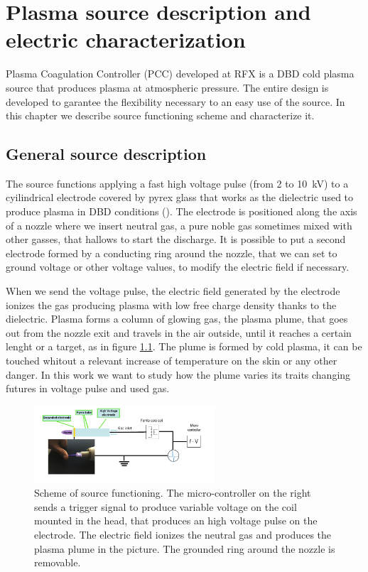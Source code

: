 \chapter{Plasma source description and electric characterization}
\label{ch:electric}
Plasma Coagulation Controller (PCC) developed at RFX is a DBD cold plasma source that produces plasma at atmospheric pressure. The entire design is developed to garantee the flexibility necessary to an easy use of the source. In this chapter we describe source functioning scheme and characterize it.

\section{General source description}
The source functions applying a fast high voltage pulse (from \num{2} to \SI{10}{\kilo\volt}) to a cyilindrical electrode covered by pyrex glass that works as the dielectric used to produce plasma in DBD conditions (\cite{DeMasi_2018}). The electrode is positioned along the axis of a nozzle where we insert neutral gas, a pure noble gas sometimes mixed with other gasses, that hallows to start the discharge. It is possible to put a second electrode formed by a conducting ring around the nozzle, that we can set to ground voltage or other voltage values, to modify the electric field if necessary.

When we send the voltage pulse, the electric field generated by the electrode ionizes the gas producing plasma with low free charge density thanks to the dielectric. Plasma forms a column of glowing gas, the plasma plume, that goes out from the nozzle exit and travels in the air outside, until it reaches a certain lenght or a target, as in figure \ref{fig:source_scheme}. The plume is formed by cold plasma, it can be touched whitout a relevant increase of temperature on the skin or any other danger. In this work we want to study how the plume varies its traits changing futures in voltage pulse and used gas.

\begin{figure}
 \centering
 \includegraphics[width=0.6\textwidth]{Images/Electric/scheme.png}
 \caption{Scheme of source functioning. The micro-controller on the right sends a trigger signal to produce variable voltage on the coil mounted in the head, that produces an high voltage pulse on the electrode. The electric field ionizes the neutral gas and produces the plasma plume in the picture. The grounded ring around the nozzle is removable.}
 \label{fig:source_scheme}
\end{figure}

